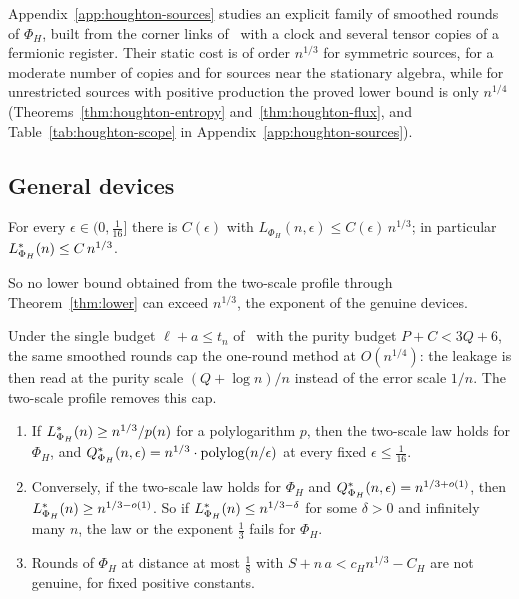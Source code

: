 Appendix~\ref{app:houghton-sources} studies an explicit family of
smoothed rounds of $\Phi_H$, built from the corner links
of~\cite[Section~4.2]{DouglasMghirbiB} with a clock and several tensor
copies of a fermionic register. Their static cost is of order $n^{1/3}$
for symmetric sources, for a moderate number of copies and for sources
near the stationary algebra, while for unrestricted sources with
positive production the proved lower bound is only $n^{1/4}$
(Theorems~\ref{thm:houghton-entropy} and~\ref{thm:houghton-flux}, and
Table~\ref{tab:houghton-scope} in Appendix~\ref{app:houghton-sources}).

\subsection{General devices}

\begin{proposition}\label{prop:ceiling-houghton}
For every $\epsilon\in(0,\frac1{16}]$ there is $C(\epsilon)$ with $L_{\Phi_H}(n,\epsilon)\le C(\epsilon)\,n^{1/3}$; in particular $L^{*}_{\Phi_H}(n)\le C\,n^{1/3}$.
\end{proposition}

So no lower bound obtained from the two-scale profile through Theorem~\ref{thm:lower} can exceed $n^{1/3}$, the exponent of the genuine devices.

\begin{remark}\label{rem:quarter}
Under the single budget $\ell+a\le t_n$ of~\cite[Theorem~5.2]{DouglasMghirbiB} with the purity budget $P+C<3Q+6$, the same smoothed rounds cap the
one-round method at $O(n^{1/4})$: the leakage is then read at the purity scale $(Q+\log n)/n$ instead of the error scale $1/n$. The two-scale
profile removes this cap.
\end{remark}

\begin{theorem}\label{thm:houghton-reduction}
\begin{enumerate}[label=(\alph*),itemsep=1pt]
\item If $L^{*}_{\Phi_H}(n)\ge n^{1/3}/p(n)$ for a polylogarithm $p$, then the two-scale law holds for $\Phi_H$, and $Q^{*}_{\Phi_H}(n,\epsilon)=n^{1/3}\cdot\mathrm{polylog}(n/\epsilon)$
at every fixed $\epsilon\le\frac1{16}$.
\item Conversely, if the two-scale law holds for $\Phi_H$ and $Q^{*}_{\Phi_H}(n,\epsilon)=n^{1/3+o(1)}$, then $L^{*}_{\Phi_H}(n)\ge n^{1/3-o(1)}$. So if
$L^{*}_{\Phi_H}(n)\le n^{1/3-\delta}$ for some $\delta>0$ and infinitely many $n$, the law or the exponent $\frac13$ fails for $\Phi_H$.
\item Rounds of $\Phi_H$ at distance at most $\frac18$ with
$S+n\,a<c_Hn^{1/3}-C_H$ are not genuine, for fixed positive constants.
\end{enumerate}
\end{theorem}

